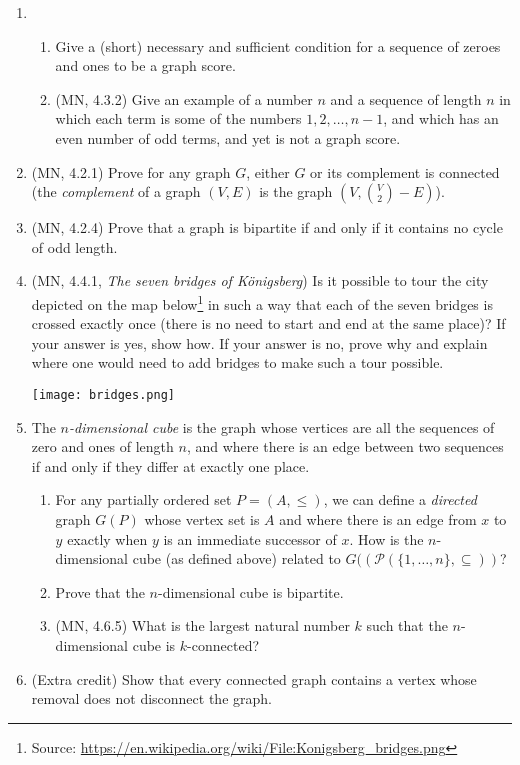 \documentclass{amsart}
\theoremstyle{definition}
\newcommand{\Ps}{\mathcal{P}}
\begin{document}
\begin{enumerate}

\item
  \begin{enumerate}
  \item Give a (short) necessary and sufficient condition for a sequence of zeroes and ones to be a graph score.
  \item (MN, 4.3.2) Give an example of a number $n$ and a sequence of length $n$ in which each term is some of the numbers $1, 2, \ldots, n - 1$, and which has an even number of odd terms, and yet is not a graph score.
  \end{enumerate}
\item (MN, 4.2.1) Prove for any graph $G$, either $G$ or its complement is connected (the \emph{complement} of a graph $(V, E)$ is the graph $\left(V, {V \choose 2} - E \right)$).
\item (MN, 4.2.4) Prove that a graph is bipartite if and only if it contains no cycle of odd length.
\item (MN, 4.4.1, \emph{The seven bridges of Königsberg}) Is it possible to tour the city depicted on the map below\footnote{Source: \url{https://en.wikipedia.org/wiki/File:Konigsberg_bridges.png}} in such a way that each of the seven bridges is crossed exactly once (there is no need to start and end at the same place)? If your answer is yes, show how. If your answer is no, prove why and explain where one would need to add bridges to make such a tour possible.

  \texttt{[image: bridges.png]}
\item
  The \emph{$n$-dimensional cube} is the graph whose vertices are all the sequences of zero and ones of length $n$, and where there is an edge between two sequences if and only if they differ at exactly one place.

  \begin{enumerate}
  \item For any partially ordered set $P = (A, \le)$, we can define a \emph{directed} graph $G (P)$ whose vertex set is $A$ and where there is an edge from $x$ to $y$ exactly when $y$ is an immediate successor of $x$. How is the $n$-dimensional cube (as defined above) related to $G ((\Ps (\{1, \ldots, n\}, \subseteq))$?
    \item Prove that the $n$-dimensional cube is bipartite.
    \item (MN, 4.6.5) What is the largest natural number $k$ such that the $n$-dimensional cube is $k$-connected?
    \end{enumerate}

\item (Extra credit) Show that every connected graph contains a vertex whose removal does not disconnect the graph.
\end{enumerate}
\end{document}
